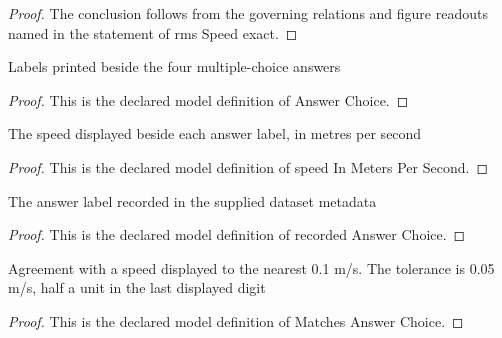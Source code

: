 \begin{proof}
  The conclusion follows from the governing relations and figure readouts named in the statement of rms Speed exact.
\end{proof}
\begin{definition}
  \label{def:physics:phyx-mini-0377:phyxminiproblems-problemphyxmini0377-answerchoice}
  Labels printed beside the four multiple-choice answers
\end{definition}
\begin{proof}
  This is the declared model definition of Answer Choice.
\end{proof}
\begin{definition}
  \label{def:physics:phyx-mini-0377:phyxminiproblems-problemphyxmini0377-answerchoice-speedinmeterspersecond}
  The speed displayed beside each answer label, in metres per second
\end{definition}
\begin{proof}
  This is the declared model definition of speed In Meters Per Second.
\end{proof}
\begin{definition}
  \label{def:physics:phyx-mini-0377:phyxminiproblems-problemphyxmini0377-recordedanswerchoice}
  The answer label recorded in the supplied dataset metadata
\end{definition}
\begin{proof}
  This is the declared model definition of recorded Answer Choice.
\end{proof}
\begin{definition}
  \label{def:physics:phyx-mini-0377:phyxminiproblems-problemphyxmini0377-matchesanswerchoice}
  Agreement with a speed displayed to the nearest 0.1 m/s. The tolerance is 0.05 m/s, half a unit in the last displayed digit
\end{definition}
\begin{proof}
  This is the declared model definition of Matches Answer Choice.
\end{proof}
